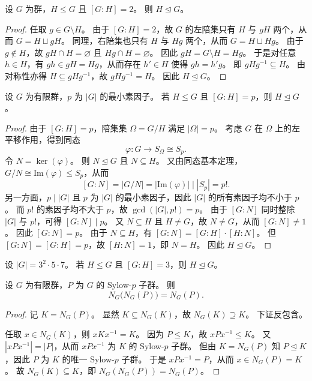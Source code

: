 \documentclass[lang=cn,a4paper,newtx]{elegantbook}
\begin{document}
\begin{corollary}
  设 $G$ 为群，$H\le G$ 且 $[G:H]=2$。
  则 $H\trianglelefteq G$。
\end{corollary}

\begin{proof}
  任取 $g\in G\setminus H$。
  由于 $[G:H]=2$，故 $G$ 的左陪集只有 $H$ 与 $gH$ 两个，从而 $G=H\sqcup gH$。
  同理，右陪集也只有 $H$ 与 $Hg$ 两个，从而 $G=H\sqcup Hg$。
  由于 $g\notin H$，故 $gH\cap H=\varnothing$ 且 $Hg\cap H=\varnothing$。
  因此 $gH=G\setminus H=Hg$。
  于是对任意 $h\in H$，有 $gh\in gH=Hg$，从而存在 $h'\in H$ 使得 $gh=h'g$。
  即 $gHg^{-1}\subseteq H$。
  由对称性亦得 $H\subseteq gHg^{-1}$，故 $gHg^{-1}=H$。
  因此 $H\trianglelefteq G$。
\end{proof}

\begin{proposition}
  设 $G$ 为有限群，$p$ 为 $|G|$ 的最小素因子。
  若 $H\le G$ 且 $[G:H]=p$，则 $H\trianglelefteq G$。
\end{proposition}

\begin{proof}
  由于 $[G:H]=p$，陪集集 $\Omega=G/H$ 满足 $|\Omega|=p$。
  考虑 $G$ 在 $\Omega$ 上的左平移作用，得到同态
  \[
    \varphi:G\to S_{\Omega}\cong S_p.
  \]
  令 $N=\ker(\varphi)$。
  则 $N\trianglelefteq G$ 且 $N\subseteq H$。
  又由同态基本定理，$G/N\cong \mathrm{Im}(\varphi)\le S_p$，从而
  \[
    [G:N]=|G/N|=|\mathrm{Im}(\varphi)|\mid |S_p|=p!.
  \]
  另一方面，$p\mid |G|$ 且 $p$ 为 $|G|$ 的最小素因子，因此 $|G|$ 的所有素因子均不小于 $p$。
  而 $p!$ 的素因子均不大于 $p$，故 $\gcd(|G|,p!)=p$。
  由于 $[G:N]$ 同时整除 $|G|$ 与 $p!$，可得 $[G:N]\mid p$。
  又 $N\subseteq H$ 且 $H\ne G$，故 $N\ne G$，从而 $[G:N]\ne 1$。
  因此 $[G:N]=p$。
  由于 $N\subseteq H$，有 $[G:N]=[G:H]\cdot [H:N]$。
  但 $[G:N]=[G:H]=p$，故 $[H:N]=1$，即 $N=H$。
  因此 $H\trianglelefteq G$。
\end{proof}

\begin{corollary}
  设 $|G|=3^2\cdot 5\cdot 7$。
  若 $H\le G$ 且 $[G:H]=3$，则 $H\trianglelefteq G$。
\end{corollary}

\begin{proposition}
  设 $G$ 为有限群，$P$ 为 $G$ 的 Sylow-$p$ 子群。
  则
  \[
    N_G\bigl(N_G(P)\bigr)=N_G(P).
  \]
\end{proposition}

\begin{proof}
  记 $K=N_G(P)$。
  显然 $K\subseteq N_G(K)$，故 $N_G(K)\supseteq K$。
  下证反包含。

  任取 $x\in N_G(K)$，则 $xKx^{-1}=K$。
  因为 $P\le K$，故 $xPx^{-1}\le K$。
  又 $|xPx^{-1}|=|P|$，从而 $xPx^{-1}$ 为 $K$ 的 Sylow-$p$ 子群。
  但由 $K=N_G(P)$ 知 $P\trianglelefteq K$，因此 $P$ 为 $K$ 的唯一 Sylow-$p$ 子群。
  于是 $xPx^{-1}=P$，从而 $x\in N_G(P)=K$。
  故 $N_G(K)\subseteq K$，即 $N_G(N_G(P))=N_G(P)$。
\end{proof}
\end{document}
